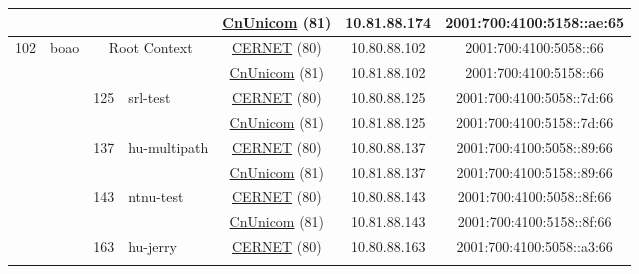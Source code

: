 \begin{small}
\begin{center}
\begin{longtable}{|c|c|c|c|c|c|c|c|}
  &  &  &  & \multicolumn{2}{|c|}{\tiny{\href{http://www.chinaunicom.com}{CnUnicom} (81)}} & \tiny{10.81.88.174} & \tiny{2001:700:4100:5158::ae:65} \\ \hline
 \multirow{12}{*}{\tiny{102}} & \multicolumn{1}{|l|}{\multirow{12}{*}{\tiny{boao}}} & \multicolumn{2}{|c|}{\multirow{2}{*}{\tiny{Root Context}}} & \multicolumn{2}{|c|}{\tiny{\href{http://www.cernet.edu.cn}{CERNET} (80)}} & \tiny{10.80.88.102} & \tiny{2001:700:4100:5058::66} \\* \cline{5-5}\cline{6-6}\cline{7-7}\cline{8-8}
  &  & \multicolumn{2}{|c|}{} & \multicolumn{2}{|c|}{\tiny{\href{http://www.chinaunicom.com}{CnUnicom} (81)}} & \tiny{10.81.88.102} & \tiny{2001:700:4100:5158::66} \\* \cline{3-3}\cline{4-4}\cline{5-5}\cline{6-6}\cline{7-7}\cline{8-8}
  &  & \multirow{2}{*}{\tiny{125}} & \multicolumn{1}{|l|}{\multirow{2}{*}{\tiny{srl-test}}} & \multicolumn{2}{|c|}{\tiny{\href{http://www.cernet.edu.cn}{CERNET} (80)}} & \tiny{10.80.88.125} & \tiny{2001:700:4100:5058::7d:66} \\* \cline{5-5}\cline{6-6}\cline{7-7}\cline{8-8}
  &  &  &  & \multicolumn{2}{|c|}{\tiny{\href{http://www.chinaunicom.com}{CnUnicom} (81)}} & \tiny{10.81.88.125} & \tiny{2001:700:4100:5158::7d:66} \\* \cline{3-3}\cline{4-4}\cline{5-5}\cline{6-6}\cline{7-7}\cline{8-8}
  &  & \multirow{2}{*}{\tiny{137}} & \multicolumn{1}{|l|}{\multirow{2}{*}{\tiny{hu-multipath}}} & \multicolumn{2}{|c|}{\tiny{\href{http://www.cernet.edu.cn}{CERNET} (80)}} & \tiny{10.80.88.137} & \tiny{2001:700:4100:5058::89:66} \\* \cline{5-5}\cline{6-6}\cline{7-7}\cline{8-8}
  &  &  &  & \multicolumn{2}{|c|}{\tiny{\href{http://www.chinaunicom.com}{CnUnicom} (81)}} & \tiny{10.81.88.137} & \tiny{2001:700:4100:5158::89:66} \\* \cline{3-3}\cline{4-4}\cline{5-5}\cline{6-6}\cline{7-7}\cline{8-8}
  &  & \multirow{2}{*}{\tiny{143}} & \multicolumn{1}{|l|}{\multirow{2}{*}{\tiny{ntnu-test}}} & \multicolumn{2}{|c|}{\tiny{\href{http://www.cernet.edu.cn}{CERNET} (80)}} & \tiny{10.80.88.143} & \tiny{2001:700:4100:5058::8f:66} \\* \cline{5-5}\cline{6-6}\cline{7-7}\cline{8-8}
  &  &  &  & \multicolumn{2}{|c|}{\tiny{\href{http://www.chinaunicom.com}{CnUnicom} (81)}} & \tiny{10.81.88.143} & \tiny{2001:700:4100:5158::8f:66} \\* \cline{3-3}\cline{4-4}\cline{5-5}\cline{6-6}\cline{7-7}\cline{8-8}
  &  & \multirow{2}{*}{\tiny{163}} & \multicolumn{1}{|l|}{\multirow{2}{*}{\tiny{hu-jerry}}} & \multicolumn{2}{|c|}{\tiny{\href{http://www.cernet.edu.cn}{CERNET} (80)}} & \tiny{10.80.88.163} & \tiny{2001:700:4100:5058::a3:66} \\* \cline{5-5}\cline{6-6}\cline{7-7}\cline{8-8}

\end{longtable}
\end{center}
\end{small}
